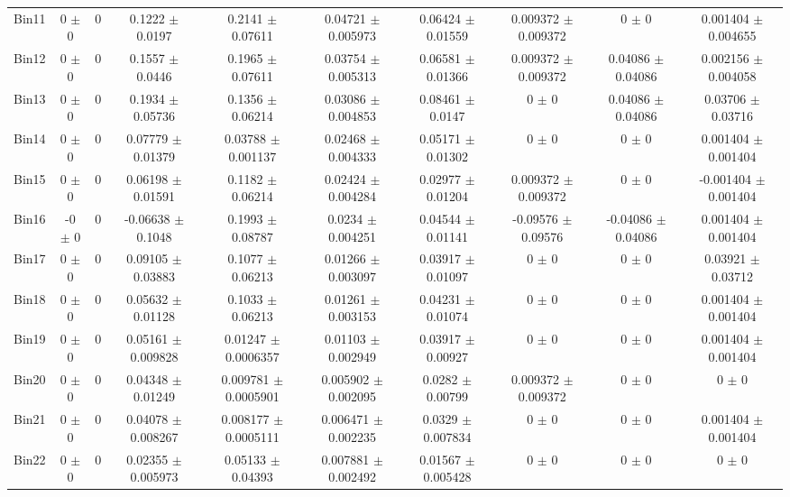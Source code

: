 \begin{tabular}{@{\extracolsep{4pt}}lccccccccc@{}}
     Bin11 & 0 $\pm$ 0 & 0 & 0.1222 $\pm$ 0.0197 & 0.2141 $\pm$ 0.07611 & 0.04721 $\pm$ 0.005973 & 0.06424 $\pm$ 0.01559 & 0.009372 $\pm$ 0.009372 & 0 $\pm$ 0 & 0.001404 $\pm$ 0.004655 \\ 
     Bin12 & 0 $\pm$ 0 & 0 & 0.1557 $\pm$ 0.0446 & 0.1965 $\pm$ 0.07611 & 0.03754 $\pm$ 0.005313 & 0.06581 $\pm$ 0.01366 & 0.009372 $\pm$ 0.009372 & 0.04086 $\pm$ 0.04086 & 0.002156 $\pm$ 0.004058 \\ 
     Bin13 & 0 $\pm$ 0 & 0 & 0.1934 $\pm$ 0.05736 & 0.1356 $\pm$ 0.06214 & 0.03086 $\pm$ 0.004853 & 0.08461 $\pm$ 0.0147 & 0 $\pm$ 0 & 0.04086 $\pm$ 0.04086 & 0.03706 $\pm$ 0.03716 \\ 
     Bin14 & 0 $\pm$ 0 & 0 & 0.07779 $\pm$ 0.01379 & 0.03788 $\pm$ 0.001137 & 0.02468 $\pm$ 0.004333 & 0.05171 $\pm$ 0.01302 & 0 $\pm$ 0 & 0 $\pm$ 0 & 0.001404 $\pm$ 0.001404 \\ 
     Bin15 & 0 $\pm$ 0 & 0 & 0.06198 $\pm$ 0.01591 & 0.1182 $\pm$ 0.06214 & 0.02424 $\pm$ 0.004284 & 0.02977 $\pm$ 0.01204 & 0.009372 $\pm$ 0.009372 & 0 $\pm$ 0 & -0.001404 $\pm$ 0.001404 \\ 
     Bin16 & -0 $\pm$ 0 & 0 & -0.06638 $\pm$ 0.1048 & 0.1993 $\pm$ 0.08787 & 0.0234 $\pm$ 0.004251 & 0.04544 $\pm$ 0.01141 & -0.09576 $\pm$ 0.09576 & -0.04086 $\pm$ 0.04086 & 0.001404 $\pm$ 0.001404 \\ 
     Bin17 & 0 $\pm$ 0 & 0 & 0.09105 $\pm$ 0.03883 & 0.1077 $\pm$ 0.06213 & 0.01266 $\pm$ 0.003097 & 0.03917 $\pm$ 0.01097 & 0 $\pm$ 0 & 0 $\pm$ 0 & 0.03921 $\pm$ 0.03712 \\ 
     Bin18 & 0 $\pm$ 0 & 0 & 0.05632 $\pm$ 0.01128 & 0.1033 $\pm$ 0.06213 & 0.01261 $\pm$ 0.003153 & 0.04231 $\pm$ 0.01074 & 0 $\pm$ 0 & 0 $\pm$ 0 & 0.001404 $\pm$ 0.001404 \\ 
     Bin19 & 0 $\pm$ 0 & 0 & 0.05161 $\pm$ 0.009828 & 0.01247 $\pm$ 0.0006357 & 0.01103 $\pm$ 0.002949 & 0.03917 $\pm$ 0.00927 & 0 $\pm$ 0 & 0 $\pm$ 0 & 0.001404 $\pm$ 0.001404 \\ 
     Bin20 & 0 $\pm$ 0 & 0 & 0.04348 $\pm$ 0.01249 & 0.009781 $\pm$ 0.0005901 & 0.005902 $\pm$ 0.002095 & 0.0282 $\pm$ 0.00799 & 0.009372 $\pm$ 0.009372 & 0 $\pm$ 0 & 0 $\pm$ 0 \\ 
     Bin21 & 0 $\pm$ 0 & 0 & 0.04078 $\pm$ 0.008267 & 0.008177 $\pm$ 0.0005111 & 0.006471 $\pm$ 0.002235 & 0.0329 $\pm$ 0.007834 & 0 $\pm$ 0 & 0 $\pm$ 0 & 0.001404 $\pm$ 0.001404 \\ 
     Bin22 & 0 $\pm$ 0 & 0 & 0.02355 $\pm$ 0.005973 & 0.05133 $\pm$ 0.04393 & 0.007881 $\pm$ 0.002492 & 0.01567 $\pm$ 0.005428 & 0 $\pm$ 0 & 0 $\pm$ 0 & 0 $\pm$ 0 \\ 

\end{tabular}
